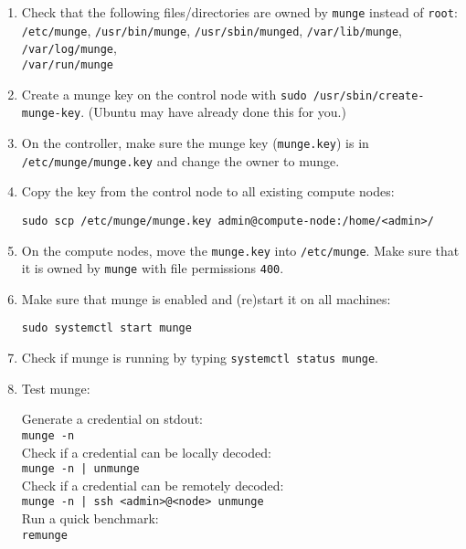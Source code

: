 \begin{enumerate}
\begin{enumerate}
	\item Check that the following files/directories are owned by \texttt{munge} instead of \texttt{root}: \\
	\texttt{/etc/munge}, 
	\texttt{/usr/bin/munge}, 
	\texttt{/usr/sbin/munged}, 
	\texttt{/var/lib/munge}, 
	\texttt{/var/log/munge}, \\
	\texttt{/var/run/munge}

	\item Create a munge key on the control node with \texttt{sudo /usr/sbin/create-munge-key}. (Ubuntu may have already done this for you.) 

	\item On the controller, make sure the munge key (\texttt{munge.key}) is in \texttt{/etc/munge/munge.key} and change the owner to munge.  

	\item Copy the key from the control node to all existing compute nodes: 

		\texttt{sudo scp /etc/munge/munge.key admin@compute-node:/home/<admin>/}

	\item On the compute nodes, move the \texttt{munge.key} into \texttt{/etc/munge}. Make sure that it is owned by \texttt{munge} with file permissions \texttt{400}.

	\item Make sure that munge is enabled and (re)start it on all machines:

		\texttt{sudo systemctl start munge}

	\item Check if munge is running by typing \texttt{systemctl status munge}.

	\item Test munge: 

	    Generate a credential on stdout: \\
	    \texttt{munge -n} \\
	    Check if a credential can be locally decoded: \\
	    \texttt{munge -n | unmunge} \\
	    Check if a credential can be remotely decoded: \\
	    \texttt{munge -n | ssh <admin>@<node> unmunge} \\
	    Run a quick benchmark: \\
	    \texttt{remunge}

	\end{enumerate}


\end{enumerate}
